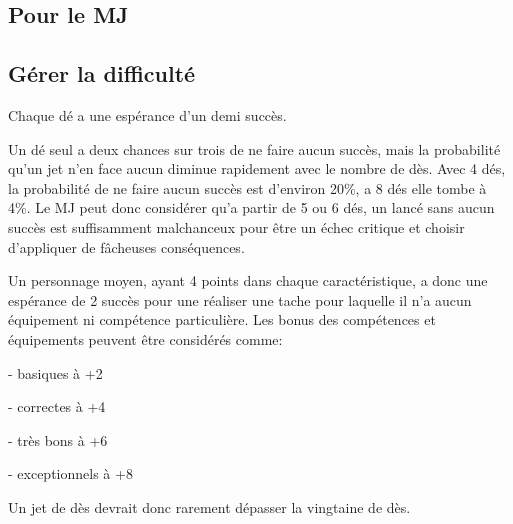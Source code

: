 \begin{landscape}
\begin{multicols}{2}


\section{Pour le MJ}

\subsection{Gérer la difficulté}

Chaque dé a une espérance d'un demi succès.
 
Un dé seul a deux chances sur trois de ne faire aucun succès, mais la probabilité qu'un jet n'en face aucun diminue rapidement avec le nombre de dès. 
Avec 4 dés, la probabilité de ne faire aucun succès est d'environ 20\%, a 8 dés elle tombe à 4\%.
Le MJ peut donc considérer qu'a partir de 5 ou 6 dés, un lancé sans aucun succès est suffisamment malchanceux pour être un échec critique et choisir d'appliquer de fâcheuses conséquences.



Un personnage moyen, ayant 4 points dans chaque caractéristique, a donc une espérance de 2 succès pour une réaliser une tache pour laquelle il n'a aucun équipement ni compétence particulière.
Les bonus des compétences et équipements peuvent être considérés comme:

- basiques à +2

- correctes à +4

- très bons à +6

- exceptionnels à +8

Un jet de dès devrait donc rarement dépasser la vingtaine de dès.


\end{multicols}
\end{landscape}
